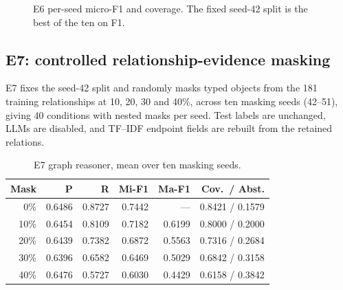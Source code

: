 \documentclass[10pt,twocolumn,a4paper]{extarticle}
\begin{document}
\begin{figure}[t]
\centering
{}
\caption{E6 per-seed micro-F1 and coverage. The fixed seed-42 split is the best of the ten on F1.}
\label{fig:e6}
\end{figure}

\subsection{E7: controlled relationship-evidence masking}
E7 fixes the seed-42 split and randomly masks typed  objects from the 181 training relationships at 10, 20, 30 and 40\%, across ten masking seeds (42--51), giving 40 conditions with nested masks per seed. Test labels are unchanged, LLMs are disabled, and TF--IDF endpoint fields are rebuilt from the retained relations.

\begin{table}[t]
\centering
\caption{E7 graph reasoner, mean over ten masking seeds.}
\label{tab:e7g}
\begin{tabular}{@{}r rrr r r@{}}
\toprule
\textbf{Mask} & \textbf{P} & \textbf{R} & \textbf{Mi-F1} & \textbf{Ma-F1} & \textbf{Cov.\ / Abst.}\\
\midrule
0\% & 0.6486 & 0.8727 & 0.7442 & --- & 0.8421 / 0.1579\\
10\% & 0.6454 & 0.8109 & 0.7182 & 0.6199 & 0.8000 / 0.2000\\
20\% & 0.6439 & 0.7382 & 0.6872 & 0.5563 & 0.7316 / 0.2684\\
30\% & 0.6396 & 0.6582 & 0.6469 & 0.5029 & 0.6842 / 0.3158\\
40\% & 0.6476 & 0.5727 & 0.6030 & 0.4429 & 0.6158 / 0.3842\\
\bottomrule
\end{tabular}
\end{table}
\end{document}
